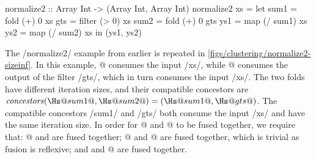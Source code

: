 \begin{haskell}[float,label=figs/clustering/normalize2-sizeinf,caption=Normalize2 function]
normalize2 :: Array Int -> (Array Int, Array Int)
normalize2 xs
 = let sum1 = fold   (+)  0   xs
       gts  = filter (>   0)  xs
       sum2 = fold   (+)  0   gts
       ys1  = map    (/ sum1) xs
       ys2  = map    (/ sum2) xs
   in (ys1, ys2)
\end{haskell}

The \Hs/normalize2/ example from earlier is repeated in \cref{figs/clustering/normalize2-sizeinf}.
In this example, @ consumes the input \Hs/xs/, while @ consumes the output of the filter \Hs/gts/, which in turn consumes the input \Hs/xs/.
The two folds have different iteration sizes, and their compatible concestors are $\concestors(\Hs@sum1@, \Hs@sum2@) = (\Hs@sum1@, \Hs@gts@)$.
The compatible concestors \Hs/sum1/ and \Hs/gts/ both consume the input \Hs/xs/ and have the same iteration size.
In order for @ and @ to be fused together, we require that: @ and \Hs@gts@ are fused together; @ and @ are fused together, which is trivial as fusion is reflexive;  and \Hs@gts@ and @ are fused together.
